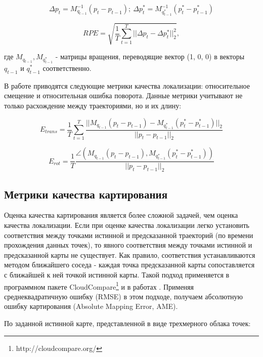\documentclass{mipt-thesis-ms}
\begin{document}
	$$\Delta p_t = M_{q_{t-1}}^{-1} (p_t - p_{t-1});\ \Delta p_t^* = M_{q_{t-1}^*}^{-1} (p_t^* - p_{t-1}^*)$$
	
	\begin{equation}
	\label{eq_rpe}
	RPE = \sqrt{\frac{1}{T} \sum_{t=1}^T ||\Delta p_t - \Delta p_t^* ||_2^2},
	\end{equation}
	
	где $M_{q_{t-1}}, M_{q_{t-1}^*}$ - матрицы вращения, переводящие вектор (1, 0, 0) в векторы $q_{t-1}$ и $q_{t-1}^*$ соответственно.
	
	В работе \cite{geiger2012we} приводятся следующие метрики качества локализации: относительное смещение и относительная ошибка поворота. Данные метрики учитывают не только расхождение между траекториями, но и их длину:
	
	\begin{equation}
	\label{eq_etrans}
	E_{trans} = \frac{1}{T} \sum\limits_{t=1}^T \frac{|| M_{q_{t-1}} (p_t - p_{t-1}) - M_{q_{t-1}^*} (p_t^* - p_{t-1}^*) ||_2}{|| p_t - p_{t-1} ||_2}
	\end{equation}
	
	\begin{equation}
	\label{eq_erot}
	E_{rot} = \frac{1}{T} \frac{\angle(M_{q_{t-1}} (p_t - p_{t-1}), M_{q_{t-1}^*} (p_t^* - p_{t-1}^*))}{|| p_t - p_{t-1} ||_2}
	\end{equation}
	
	\subsection{Метрики качества картирования}
	\label{section_our_ame}
	
	Оценка качества картирования является более сложной задачей, чем оценка качества локализации. Если при оценке качества локализации легко установить соответствия между точками истинной и предсказанной траекторий (по времени прохождения данных точек), то явного соответствия между точками истинной и предсказанной карты не существует. Как правило, соответствия устанавливаются методом ближайшего соседа - каждая точка предсказанной карты сопоставляется с ближайшей к ней точкой истинной карты. Такой подход применяется в программном пакете CloudCompare\footnote{http://cloudcompare.org/} и в работах \cite{handa2014benchmark}\cite{wasenmuller2016corbs}. Применяя среднеквадратичную ошибку (RMSE) в этом подходе, получаем абсолютную ошибку картирования (Absolute Mapping Error, AME).
	
	По заданной истинной карте, представленной в виде трехмерного облака точек:
	
\end{document}
